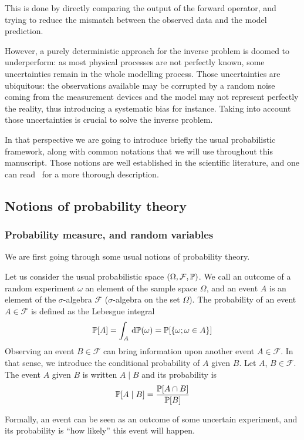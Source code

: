\documentclass[../../Main_ManuscritThese.tex]{subfiles}
\begin{document}
This is done by directly comparing the output of the forward operator,
and trying to reduce the mismatch between the observed data and the
model prediction.



However, a purely deterministic approach for the inverse problem is
doomed to underperform: as most physical processes are not perfectly
known, some uncertainties remain in the whole modelling process. Those
uncertainties are ubiquitous: the observations available may be
corrupted by a random noise coming from the measurement devices and
the model may not represent perfectly the reality, thus introducing a
systematic bias for instance. Taking into account those uncertainties
is crucial to solve the inverse problem.



In that perspective we are going to introduce briefly the usual
probabilistic framework, along with common notations that we will use
throughout this manuscript. Those notions are well established in the
scientific literature, and one can
read~\cite{billingsley_probability_2008} for a more thorough
description.


\subsection{Notions of probability theory}
\subsubsection{Probability measure, and random variables}
\label{sec:notion_prob_theory}

We are first going through some usual notions of probability theory. 
\begin{definition}
  \label{def:prob_event}
  Let us consider the usual probabilistic space $(\Omega, \mathcal{F}, \mathbb{P})$.
  We call an outcome of a random experiment $\omega$ an element of the
  sample space $\Omega$, and an event $A$ is an element of the
  $\sigma$-algebra $\mathcal{F}$ ($\sigma$-algebra on the set
  $\Omega$). The probability of an event $A\in \mathcal{F}$ is defined
  as the Lebesgue integral
  \begin{equation}
    \mathbb{P}[A] = \int_{A} \,\mathrm{d}\mathbb{P}(\omega) = \mathbb{P}[\{\omega ; \omega \in A\}]
  \end{equation}
  Observing an event $B \in \mathcal{F}$ can bring information upon
  another event $A\in \mathcal{F}$. In that sense, we introduce the
  conditional probability of $A$ given $B$.
\label{def:cond_proba}
  Let $A$, $B \in \mathcal{F}$.
  The event $A$ given $B$ is written $A \mid B$ and its probability is
  \begin{equation}
    \mathbb{P}[A \mid B] = \frac{\mathbb{P}[A \cap B]}{\mathbb{P}[B]}
  \end{equation}
\end{definition}
Formally, an event can be seen as an outcome of some uncertain
experiment, and its probability is ``how likely'' this event will
happen.
\end{document}
